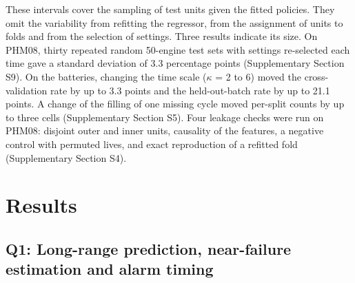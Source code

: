 \documentclass[a4paper,fleqn,doubleblind]{cas-dc}
\begin{document}
These intervals cover the sampling of test units given the fitted policies. They omit the variability from refitting the regressor, from the assignment of units to folds and from the selection of settings. Three results indicate its size. On PHM08, thirty repeated random 50-engine test sets with settings re-selected each time gave a standard deviation of 3.3 percentage points (Supplementary Section S9). On the batteries, changing the time scale ($\kappa$ = 2 to 6) moved the cross-validation rate by up to 3.3 points and the held-out-batch rate by up to 21.1 points. A change of the filling of one missing cycle moved per-split counts by up to three cells (Supplementary Section S5). Four leakage checks were run on PHM08: disjoint outer and inner units, causality of the features, a negative control with permuted lives, and exact reproduction of a refitted fold (Supplementary Section S4).

\section{Results}\label{sec:6}

\subsection{Q1: Long-range prediction, near-failure estimation and alarm timing}
\end{document}
